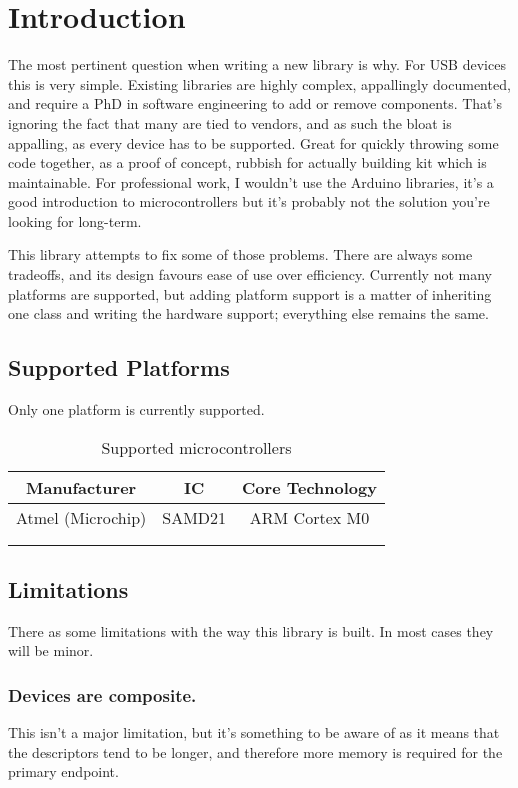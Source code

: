 \chapter{Introduction}
The most pertinent question when writing a new library is why. For USB devices this is very simple. Existing libraries are highly complex, appallingly documented, and require a PhD in software engineering to add or remove components. That's ignoring the fact that many are tied to vendors, and as such the bloat is appalling, as every device has to be supported. Great for quickly throwing some code together, as a proof of concept, rubbish for actually building kit which is maintainable. For professional work, I wouldn't use the Arduino libraries, it's a good introduction to microcontrollers but it's probably not the solution you're looking for long-term.

This library attempts to fix some of those problems. There are always some tradeoffs, and its design favours ease of use over efficiency. Currently not many platforms are supported, but adding platform support is a matter of inheriting one class and writing the hardware support; everything else remains the same.

\section{Supported Platforms}

Only one platform is currently supported.

\begin{longtable}{ c c c }
Manufacturer & IC & Core Technology \\
\endhead
Atmel (Microchip) & SAMD21 & ARM Cortex M0 \\
& & \\
\caption{Supported microcontrollers}
\label{table:supportedMicrocontrollers}
\end{longtable}

\section{Limitations}
There as some limitations with the way this library is built. In most cases they will be minor.

\subsection{Devices are composite.}
This isn't a major limitation, but it's something to be aware of as it means that the descriptors tend to be longer, and therefore more memory is required for the primary endpoint.

